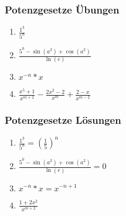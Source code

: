 \begin{frame}
    \frametitle{Potenzgesetze Übungen}
	\begin{enumerate}
		\vfill \item $\frac{1^3}{5^n}$
		\vfill \item $\frac{5^0- \sin(a^2) + \cos(a^2)}{\ln(e)}$
		\vfill \item $x^{-n} * x$
		\vfill \item $\frac{x^5 +1}{x^{m+2}} - \frac{2x^2-2}{x^m} + \frac{2-x}{x^{m-2}}$
	\end{enumerate}
\end{frame}

\begin{frame}
    \frametitle{Potenzgesetze Lösungen}
	\begin{enumerate}
		\vfill \item $\frac{1^3}{5^n} = (\frac{1}{5})^n$
		\vfill \item $\frac{5^0- \sin(a^2) + \cos(a^2)}{\ln(e)} = 0$
		\vfill \item $x^{-n} * x = x^{-n+1}$
		\vfill \item $\frac{1+2x^2}{x^{m+2}}$
	\end{enumerate}
\end{frame}
